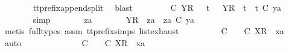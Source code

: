 \ \ \ \ \ \ \isamarkupfalse%
\ tt{\isacharunderscore}prefix{\isacharunderscore}append{\isacharunderscore}split\ \isamarkupfalse%
\ blast\isanewline
\ \ \ \ \isamarkupfalse%
\ \isamarkupfalse%
\ {\isachardoublequoteopen}{\isasymsigma}{\isacharprime}\ {\isasymle}\isactrlsub C\ {\isacharbrackleft}{\isacharbrackleft}Y{\isacharbrackright}\isactrlsub R{\isacharbrackright}\ \ {\isasymor}\ {\isacharparenleft}{\isasymexists}t{\isacharprime}{\isachardot}\ {\isasymsigma}{\isacharprime}\ {\isacharequal}\ {\isacharbrackleft}Y{\isacharbrackright}\isactrlsub R\ {\isacharhash}\ t{\isacharprime}\ {\isasymand}\ t{\isacharprime}\ {\isasymle}\isactrlsub C\ ya{\isacharparenright}{\isachardoublequoteclose}\isanewline
\ \ \ \ \ \ \isamarkupfalse%
\ simp\isanewline
\ \ \ \ \isamarkupfalse%
\ \isamarkupfalse%
\ za\ \ {\isachardoublequoteopen}{\isasymsigma}{\isacharprime}\ {\isacharequal}\ {\isacharbrackleft}{\isacharbrackright}\ {\isasymor}\ {\isacharparenleft}{\isasymsigma}{\isacharprime}\ {\isacharequal}\ {\isacharbrackleft}Y{\isacharbrackright}\isactrlsub R\ {\isacharhash}\ za\ {\isasymand}\ za\ {\isasymle}\isactrlsub C\ ya{\isacharparenright}{\isachardoublequoteclose}\isanewline
\ \ \ \ \ \ \isamarkupfalse%
\ {\isacharparenleft}metis\ {\isacharparenleft}full{\isacharunderscore}types{\isacharparenright}\ assm{}\ tt{\isacharunderscore}prefix{\isachardot}simps{\isacharparenleft}{}{\isacharparenright}\ list{\isachardot}exhaust{\isacharparenright}\isanewline
\ \ \ \ \isamarkupfalse%
\ \isamarkupfalse%
\ {\isachardoublequoteopen}{\isasymexists}{\isasymrho}{\isacharprime}{\isachardot}\ {\isasymrho}{\isacharprime}\ {\isasymsubseteq}\isactrlsub C\ {\isasymsigma}{\isacharprime}\ {\isasymand}\ {\isasymrho}{\isacharprime}\ {\isasymle}\isactrlsub C\ {\isacharbrackleft}X{\isacharbrackright}\isactrlsub R\ {\isacharhash}\ xa{\isachardoublequoteclose}\isanewline
\ \ \ \ \isamarkupfalse%
\ auto\isanewline
\ \ \ \ \ \ \isamarkupfalse%
\ {\isachardoublequoteopen}{\isasymsigma}{\isacharprime}\ {\isacharequal}\ {\isacharbrackleft}{\isacharbrackright}\ {\isasymLongrightarrow}\ {\isasymexists}{\isasymrho}{\isacharprime}{\isachardot}\ {\isasymrho}{\isacharprime}\ {\isasymsubseteq}\isactrlsub C\ {\isacharbrackleft}{\isacharbrackright}\ {\isasymand}\ {\isasymrho}{\isacharprime}\ {\isasymle}\isactrlsub C\ {\isacharbrackleft}X{\isacharbrackright}\isactrlsub R\ {\isacharhash}\ xa{\isachardoublequoteclose}\isanewline
